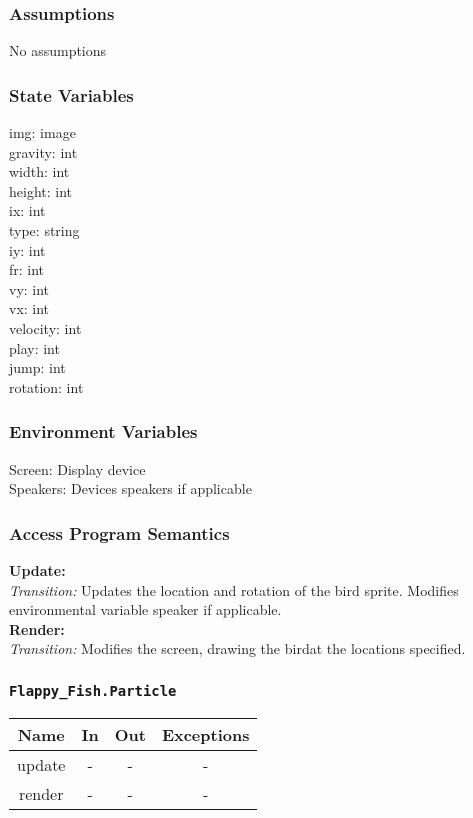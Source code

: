 \documentclass[11pt, oneside]{article}   	%
\begin{document}
\subsubsection{Assumptions}
No assumptions

\subsubsection{State Variables}
img: image\\
gravity: int\\
width: int\\
height: int \\
ix: int \\
type: string\\
iy: int \\
fr: int \\
vy: int \\
vx: int \\
velocity: int \\
play: int\\
jump: int \\
rotation: int\\

\subsubsection{Environment Variables}
Screen: Display device\\
Speakers: Devices speakers if applicable\\


\subsubsection{Access Program Semantics} 
 \textbf{Update:}  \\
 \textit{Transition:} Updates the location and rotation of the bird sprite. Modifies environmental variable speaker if applicable.\\
 \textbf{Render:}  \\
 \textit{Transition:} Modifies the screen, drawing the birdat the locations specified.\\

\subsubsection{\texttt{Flappy\_Fish.Particle}}



\begin{center}
\begin{tabular}{ |c|c|c|c| } 
 \hline
 Name & In & Out & Exceptions \\ 
 \hline \hline
 update & - & - & - \\ 
render &  -& - & - \\ 
 \hline
\end{tabular}
\end{center}
\end{document}
